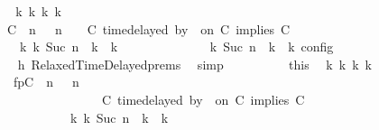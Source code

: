 \begin{isabellebody}
\ \ \ \ \ \ \ \ \isamarkupfalse%
\ \isamarkupfalse%
\ {\isacartoucheopen}{\isasymexists}{\isasymGamma}\isactrlsub k\ {\isasymPsi}\isactrlsub k\ {\isasymPhi}\isactrlsub k\ k{\isachardot}\isanewline
\ \ \ \ \ \ \ \ \ \ {\isacharparenleft}{\isacharparenleft}{\isacharparenleft}{\isacharparenleft}C\ {\isasymnot}{\isasymUp}\ n{\isacharparenright}\ {\isacharhash}\ {\isasymGamma}{\isacharparenright}{\isacharcomma}\ n\ {\isasymturnstile}\ {\isasymPsi}\ {\isasymtriangleright}\ {\isacharparenleft}{\isacharparenleft}C\ time{\isacharminus}delayed{\isasymbowtie}\ by\ {\isasymdelta}{\isasymtau}\ on\ C\ implies\ C\ {\isacharhash}\ {\isasymPhi}{\isacharparenright}{\isacharparenright}\isanewline
\ \ \ \ \ \ \ \ \ \ \ \ {\isasymhookrightarrow}\isactrlbsup k\isactrlesup \ {\isacharparenleft}{\isasymGamma}\isactrlsub k{\isacharcomma}\ Suc\ n\ {\isasymturnstile}\ {\isasymPsi}\isactrlsub k\ {\isasymtriangleright}\ {\isasymPhi}\isactrlsub k{\isacharparenright}{\isacharparenright}\isanewline
\ \ \ \ \ \ \ \ \ \ {\isasymand}\ {\isasymrho}\ {\isasymin}\ {\isasymlbrakk}\ {\isasymGamma}\isactrlsub k{\isacharcomma}\ Suc\ n\ {\isasymturnstile}\ {\isasymPsi}\isactrlsub k\ {\isasymtriangleright}\ {\isasymPhi}\isactrlsub k\ {\isasymrbrakk}\isactrlsub c\isactrlsub o\isactrlsub n\isactrlsub f\isactrlsub i\isactrlsub g{\isacartoucheclose}\isanewline
\ \ \ \ \ \ \ \ \ \ \isamarkupfalse%
\ h{}\ RelaxedTimeDelayed{\isachardot}prems\ \isamarkupfalse%
\ simp\isanewline
\ \ \ \ \ \ \ \ \isamarkupfalse%
\ this\ \isamarkupfalse%
\ {\isasymGamma}\isactrlsub k\ {\isasymPsi}\isactrlsub k\ {\isasymPhi}\isactrlsub k\ k\isanewline
\ \ \ \ \ \ \ \ \ \ \ fp{\isacharcolon}{\isacartoucheopen}{\isacharparenleft}{\isacharparenleft}{\isacharparenleft}C\ {\isasymnot}{\isasymUp}\ n{\isacharparenright}\ {\isacharhash}\ {\isasymGamma}{\isacharparenright}{\isacharcomma}\ n\isanewline
\ \ \ \ \ \ \ \ \ \ \ \ \ \ \ \ \ \ \ \ \ \ {\isasymturnstile}\ {\isasymPsi}\ {\isasymtriangleright}\ {\isacharparenleft}{\isacharparenleft}C\ time{\isacharminus}delayed{\isasymbowtie}\ by\ {\isasymdelta}{\isasymtau}\ on\ C\ implies\ C\ {\isacharhash}\ {\isasymPhi}{\isacharparenright}{\isacharparenright}\isanewline
\ \ \ \ \ \ \ \ \ \ \ \ \ \ \ \ \ \ \ \ {\isasymhookrightarrow}\isactrlbsup k\isactrlesup \ {\isacharparenleft}{\isasymGamma}\isactrlsub k{\isacharcomma}\ Suc\ n\ {\isasymturnstile}\ {\isasymPsi}\isactrlsub k\ {\isasymtriangleright}\ {\isasymPhi}\isactrlsub k{\isacharparenright}{\isacartoucheclose}\isanewline

\end{isabellebody}
